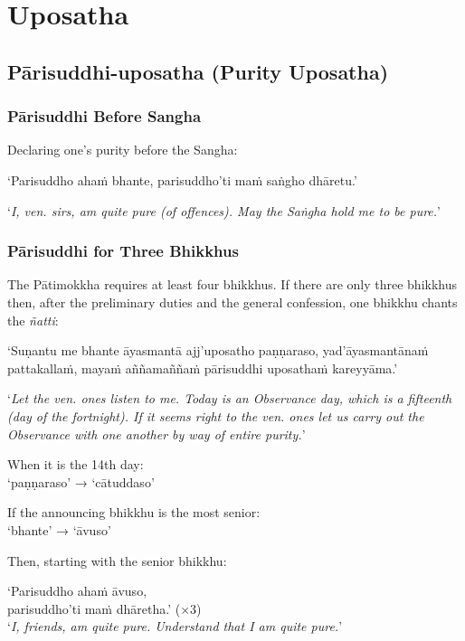 \chapter{Uposatha}

\section{Pārisuddhi-uposatha (Purity Uposatha)}

\subsection{Pārisuddhi Before Sangha}

Declaring one's purity before the Sangha:

‘Parisuddho ahaṁ bhante, parisuddho'ti maṁ saṅgho dhāretu.’

‘\emph{I, ven. sirs, am quite pure (of offences). May the Saṅgha hold me to be pure.}’


\subsection{Pārisuddhi for Three Bhikkhus}

The Pātimokkha requires at least four bhikkhus. If there are only three bhikkhus then, after the preliminary duties and the general confession, one bhikkhu
chants the \emph{ñatti}:

‘Suṇantu me bhante āyasmantā ajj'uposatho paṇṇaraso, yad'āyasmantānaṁ
pattakallaṁ, mayaṁ aññamaññaṁ pārisuddhi uposathaṁ kareyyāma.’

‘\emph{Let the ven. ones listen to me. Today is an Observance day, which is a
  fifteenth (day of the fortnight). If it seems right to the ven. ones let
  us carry out the Observance with one another by way of entire purity.}’

When it is the 14th day:\\
‘paṇṇaraso’ → ‘cātuddaso’

If the announcing bhikkhu is the most senior:\\
‘bhante’ → ‘āvuso’

Then, starting with the senior bhikkhu:

‘Parisuddho ahaṁ āvuso,\\
parisuddho'ti maṁ dhāretha.’ (×3)\\
‘\emph{I, friends, am quite pure. Understand that I am quite pure.}’

